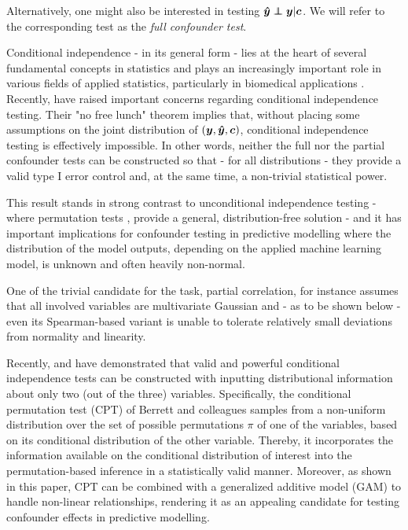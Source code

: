 \documentclass{article}
\begin{document}
Alternatively, one might also be interested in testing $\yhat \independent \y | \c$. We will refer to the corresponding test as the \emph{full confounder test}.

 Conditional independence - in its general form - lies at the heart of several fundamental concepts in statistics and  plays an increasingly important role in various fields of applied statistics, particularly in biomedical applications \citep{spirtes2000causation, peters2016causal, fiedler2011mediation, candes2016panning}. Recently, \cite{shah2020hardness} have raised important concerns regarding conditional independence testing.
 Their "no free lunch" theorem implies that, without placing some assumptions on the joint distribution of $(\boldsymbol{y}, \boldsymbol{\hat{y}}, \boldsymbol{c})$, conditional independence testing is effectively impossible. In other words, neither the full nor the partial confounder tests can be constructed so that - for all distributions - they provide a valid type I error control and, at the same time, a non-trivial statistical power.

This result stands in strong contrast to unconditional independence testing - where permutation tests  \citep{pitman1937significance, fisher1942189}, provide a general, distribution-free solution - and it has important implications for confounder testing in predictive modelling where the distribution of the model outputs, depending on the applied machine learning model, is unknown and often heavily non-normal.

One of the trivial candidate for the task, partial correlation, for instance assumes that all involved variables are multivariate Gaussian and - as to be shown below - even its Spearman-based variant is unable to tolerate relatively small deviations from normality and linearity.

Recently, \cite{candes2016panning} and \cite{berrett2020conditional} have demonstrated that valid and powerful conditional independence tests can be constructed with inputting distributional information about only two (out of the three) variables.
Specifically, the conditional permutation test (CPT) of Berrett and colleagues samples from a non-uniform distribution over the set of possible permutations $\pi$ of one of the variables, based on its conditional distribution of the other variable. Thereby, it incorporates the information available on the conditional distribution of interest into the permutation-based inference in a statistically valid manner. Moreover, as shown in this paper, CPT can be combined with a generalized additive model (GAM) to handle non-linear relationships, rendering it as an appealing candidate for testing confounder effects in predictive modelling.
\end{document}
